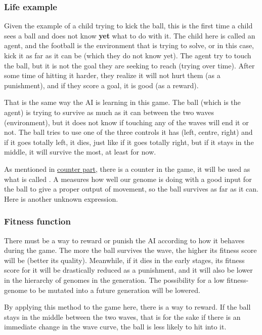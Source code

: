 \subsubsection{Life example}\label{sec:ai-life-example}
Given the example of a child trying to kick the ball, this is the first time a child sees a ball and does not know \textbf{yet} what to do with it. The child here is called an agent, and the football is the environment that is trying to solve, or in this case, kick it as far as it can be (which they do not know yet). The agent try to touch the ball, but it is not the goal they are seeking to reach (trying over time). After some time of hitting it harder, they realize it will not hurt them (as a punishment), and if they score a goal, it is good (as a reward).

That is the same way the AI is learning in this game. The ball (which is the agent) is trying to survive as much as it can between the two waves (environment), but it does not know if touching any of the waves will end it or not. The ball tries to use one of the three controls it has (left, centre, right) and if it goes totally left, it dies, just like if it goes totally right, but if it stays in the middle, it will survive the most, at least for now.

As mentioned in \hyperref[display-score]{counter part}, there is a counter in the game, it will be used as what is called . A  measures how well our genome is doing with a good input for the ball to give a proper output of movement, so the ball survives as far as it can. Here is another unknown expression.
 
\subsubsection{Fitness function}
There must be a way to reward or punish the AI according to how it behaves during the game. The more the ball survives the wave, the higher its fitness score will be (better its quality). Meanwhile, if it dies in the early stages, its fitness score for it will be drastically reduced as a punishment, and it will also be lower in the hierarchy of genomes in the generation. The possibility for a low fitness-genome to be mutated into a future generation will be lowered.

By applying this method to the game here, there is a way to reward. If the ball stays in the middle between the two waves, that is for the sake if there is an immediate change in the wave curve, the ball is less likely to hit into it.

